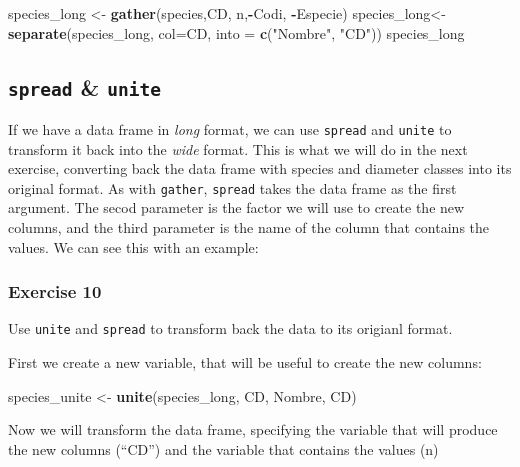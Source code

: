 \documentclass[]{article}
\newenvironment{Shaded}{\begin{snugshade}}{\end{snugshade}}
\newcommand{\KeywordTok}[1]{\textcolor[rgb]{0.13,0.29,0.53}{\textbf{#1}}}
\newcommand{\DataTypeTok}[1]{\textcolor[rgb]{0.13,0.29,0.53}{#1}}
\newcommand{\StringTok}[1]{\textcolor[rgb]{0.31,0.60,0.02}{#1}}
\newcommand{\OperatorTok}[1]{\textcolor[rgb]{0.81,0.36,0.00}{\textbf{#1}}}
\newcommand{\NormalTok}[1]{#1}
\begin{document}
\begin{Shaded}
\begin{Highlighting}[]
\NormalTok{    species_long <-}\StringTok{   }\KeywordTok{gather}\NormalTok{(species,CD, n,}\OperatorTok{-}\NormalTok{Codi, }\OperatorTok{-}\NormalTok{Especie)}
\NormalTok{    species_long<-}\KeywordTok{separate}\NormalTok{(species_long, }\DataTypeTok{col=}\NormalTok{CD, }\DataTypeTok{into =} \KeywordTok{c}\NormalTok{(}\StringTok{"Nombre"}\NormalTok{, }\StringTok{"CD"}\NormalTok{))}
\NormalTok{    species_long}
\end{Highlighting}
\end{Shaded}

\subsection{\texorpdfstring{\texttt{spread} \&
\texttt{unite}}{spread \& unite}}\label{spread-unite}

If we have a data frame in \emph{long} format, we can use
\texttt{spread} and \texttt{unite} to transform it back into the
\emph{wide} format. This is what we will do in the next exercise,
converting back the data frame with species and diameter classes into
its original format. As with \texttt{gather}, \texttt{spread} takes the
data frame as the first argument. The secod parameter is the factor we
will use to create the new columns, and the third parameter is the name
of the column that contains the values. We can see this with an example:

\subsubsection{Exercise 10}\label{exercise-10}

Use \texttt{unite} and \texttt{spread} to transform back the data to its
origianl format.

First we create a new variable, that will be useful to create the new
columns:

\begin{Shaded}
\begin{Highlighting}[]
\NormalTok{species_unite <-}\StringTok{ }\KeywordTok{unite}\NormalTok{(species_long, CD, Nombre, CD)}
\end{Highlighting}
\end{Shaded}

Now we will transform the data frame, specifying the variable that will
produce the new columns (``CD'') and the variable that contains the
values (n)
\end{document}
